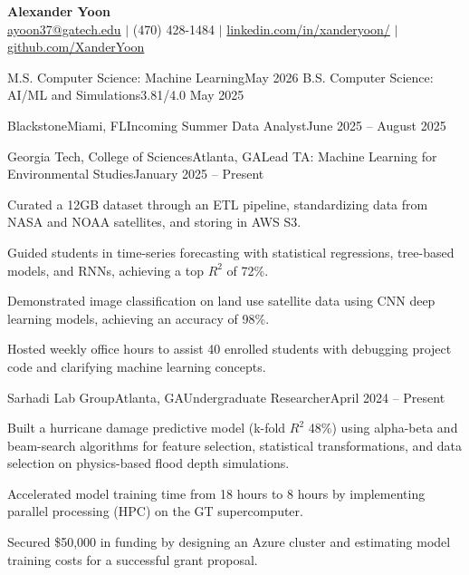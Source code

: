 \documentclass{article}
\begin{document}
\thispagestyle{empty}

\begin{center}
    \textbf{\LARGE Alexander Yoon} \\
    \href{mailto:"ayoon37@gatech.edu"}{ayoon37@gatech.edu} $|$ (470) 428-1484 $|$ \href{https://www.linkedin.com/in/xanderyoon/}{linkedin.com/in/xanderyoon/} $|$ \href{https://github.com/XanderYoon}{github.com/XanderYoon}\\
\end{center}

\begin{flushleft}


{M.S. Computer Science: Machine Learning}{May 2026} 
{B.S. Computer Science: AI/ML and Simulations}{3.81/4.0} {May 2025}

\vspace{5pt}
    \begin{experiencenolist}{Blackstone}{Miami, FL}{Incoming Summer Data Analyst}{June 2025 -- August 2025}
    \end{experiencenolist}
    \begin{experience}{Georgia Tech, College of Sciences}{Atlanta, GA}{Lead TA: Machine Learning for Environmental Studies}{January 2025 -- Present}
        \item Curated a 12GB dataset through an ETL pipeline, standardizing data from NASA and NOAA satellites, and storing in AWS S3.
        \item Guided students in time-series forecasting with statistical regressions, tree-based models, and RNNs, achieving a top $R^2$ of 72\%.
        \item Demonstrated image classification on land use satellite data using CNN deep learning models, achieving an accuracy of 98\%.
        \item Hosted weekly office hours to assist 40 enrolled students with debugging project code and clarifying machine learning concepts. 
    \end{experience}

    \begin{experience}{Sarhadi Lab Group}{Atlanta, GA}{Undergraduate Researcher}{April 2024 -- Present}        
        \item Built a hurricane damage predictive model (k-fold $R^2$ 48\%) using alpha-beta and beam-search algorithms for feature selection, statistical transformations, and data selection on physics-based flood depth simulations.
        \item Accelerated model training time from 18 hours to 8 hours by implementing parallel processing (HPC) on the GT supercomputer.
        \item Secured \$50,000 in funding by designing an Azure cluster and estimating model training costs for a successful grant proposal.
    \end{experience}
    

\end{flushleft}
\end{document}
